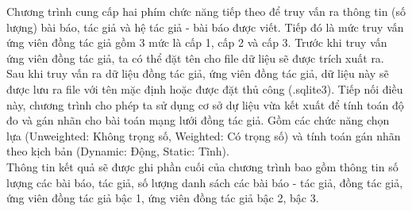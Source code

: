 \documentclass{article}
\begin{document}
Chương trình cung cấp hai phím chức năng tiếp theo để truy vấn ra thông tin (số lượng) bài báo, tác giả và hệ tác giả - bài báo được viết. Tiếp đó là mức truy vấn ứng viên đồng tác giả gồm 3 mức là cấp 1, cấp 2 và cấp 3. Trước khi truy vấn ứng viên đồng tác giả, ta có thể đặt tên cho file dữ liệu sẽ được trích xuất ra. \\


Sau khi truy vấn ra dữ liệu đồng tác giả, ứng viên đồng tác giả, dữ liệu này sẽ được lưu ra file với tên mặc định hoặc được đặt thủ công (.sqlite3). Tiếp nối điều này, chương trình cho phép ta sử dụng cơ sở dự liệu vừa kết xuất để tính toán độ đo và gán nhãn cho bài toán mạng lưới đồng tác giả. Gồm các chức năng chọn lựa (Unweighted: Không trọng số, Weighted: Có trọng số) và tính toán gán nhãn theo kịch bản (Dynamic: Động, Static: Tĩnh). \\

Thông tin kết quả sẽ được ghi phần cuối của chương trình bao gồm thông tin số lượng các bài báo, tác giả, số lượng danh sách các bài báo - tác giả, đồng tác giả, ứng viên đồng tác giả bậc 1, ứng viên đồng tác giả bậc 2, bậc 3.
\end{document}
